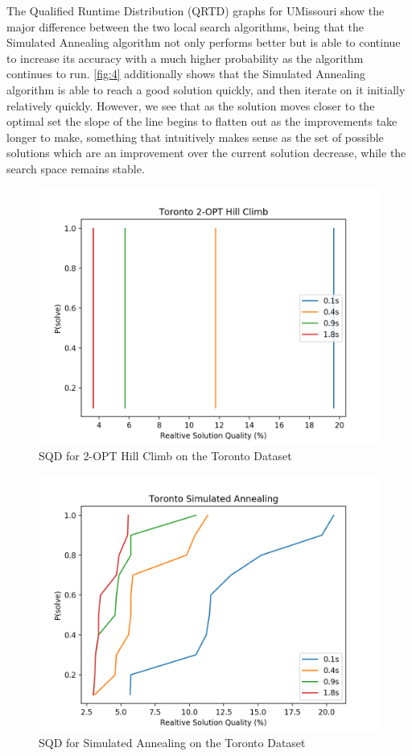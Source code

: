 \documentclass[format=sigconf]{acmart}
\begin{document}
The Qualified Runtime Distribution (QRTD) graphs for UMissouri show the major difference between the two local search algorithms, being that the 
Simulated Annealing algorithm not only performs better but is able to continue to increase its accuracy with a much higher 
probability as the algorithm continues to run. \autoref{fig:4} additionally shows that the Simulated Annealing algorithm is able 
to reach a good solution quickly, and then iterate on it initially relatively quickly. However, we see that as the solution moves 
closer to the optimal set the slope of the line begins to flatten out as the improvements take longer to make, something that intuitively makes sense 
as the set of possible solutions which are an improvement over the current solution decrease, while the search space remains stable.
\begin{figure}[htbp]
    \centerline{\includegraphics[scale=.5]{graphs/Toronto_LS1_SQD.png}}
    \caption{SQD for 2-OPT Hill Climb on the Toronto Dataset}
    \label{fig:5}
\end{figure}

\begin{figure}[htbp]
    \centerline{\includegraphics[scale=.5]{graphs/Toronto_LS2_SQD.png}}
    \caption{SQD for Simulated Annealing on the Toronto Dataset}
    \label{fig:6}
\end{figure}
\end{document}
